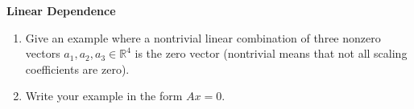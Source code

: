 \textbf{Linear Dependence}
\begin{enumerate}
	\item Give an example where a nontrivial linear combination of three nonzero vectors $a_1,a_2,a_3\in\mathbb{R}^4$ is the zero vector (nontrivial means
that not all scaling coefficients are zero). 
	\item Write your example in the form $Ax = 0$. 
\end{enumerate}
 
